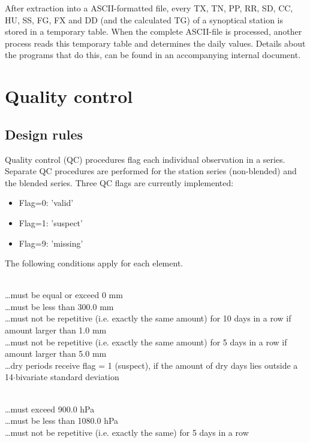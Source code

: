 \documentclass[a4paper,11pt]{article}
\begin{document}
After extraction into a ASCII-formatted file, every TX, TN, PP, RR,
SD, CC, HU, SS, FG, FX and DD (and the calculated TG) of a synoptical
station is stored in a temporary table. When the complete ASCII-file
is processed, another process reads this temporary table and
determines the daily values. Details about the programs that do this,
can be found in an accompanying internal document.





\section{Quality control}
\label{sec:qc}

\subsection{Design rules}
\label{sec:qcrules}

Quality control (QC) procedures flag each individual observation in a
series. Separate QC procedures are performed for the station series
(non-blended) and the blended series.  Three QC flags are currently
implemented:

\begin{itemize}
\item Flag=0: 'valid'
\item Flag=1: 'suspect'
\item Flag=9: 'missing'
\end{itemize}

The following conditions apply for each element.
\medskip

\\
\ldots must be equal or exceed 0 mm\\
\ldots must be less than 300.0 mm\\
\ldots must not be repetitive (i.e. exactly the same amount) for 10
days in a row if amount larger than 1.0 mm\\
\ldots must not be repetitive (i.e. exactly the same amount) for 5
days in a row if amount larger than 5.0 mm\\
\ldots dry periods receive flag = 1 (suspect), if the amount of dry
days lies outside a 14$\cdot$bivariate standard deviation
\medskip

\\
\ldots must exceed 900.0 hPa\\
\ldots must be less than 1080.0 hPa\\
\ldots must not be repetitive (i.e. exactly the same) for 5 days in a row
\medskip
\end{document}

